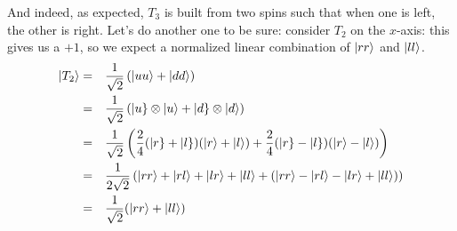 \documentclass[solutions.tex]{subfiles}
\begin{document}
And indeed, as expected, $T_3$ is built from two spins such that when
one is left, the other is right. Let's do another one to be sure: consider
$T_2$ on the $x$-axis: this gives us a $+1$, so we expect a normalized
linear combination of $|rr\rangle$ and $|ll\rangle$.
\begin{equation*}\begin{aligned}
	|T_2\rangle &=&& \frac1{\sqrt2}\left(|uu\rangle+|dd\rangle\right) \\
	~ &=&& \frac1{\sqrt2}\left( |u\}\otimes|u\rangle+|d\}\otimes|d\rangle\right) \\
	~ &=&& \frac1{\sqrt2}\left(
		\frac24(|r\}+|l\})(|r\rangle+|l\rangle)
		+\frac24(|r\}-|l\})(|r\rangle-|l\rangle)
	\right) \\
	~ &=&& \frac1{2\sqrt2}\left(
		|rr\rangle+|rl\rangle+|lr\rangle+|ll\rangle
		+(|rr\rangle-|rl\rangle-|lr\rangle+|ll\rangle)
	\right) \\
	~ &=&&\frac1{\sqrt2}(|rr\rangle+|ll\rangle)
\end{aligned}\end{equation*}
\end{document}
